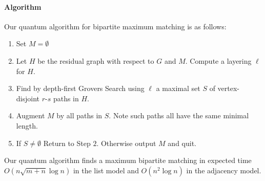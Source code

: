 \paragraph{Algorithm}
Our quantum algorithm for bipartite maximum matching is as follows:
\begin{enumerate}
\item Set $M = \emptyset$
\item  Let $H$ be the residual graph with respect to $G$ and $M$. Compute a layering $\ell$ for $H$.
\item Find by depth-first Grovers Search using $\ell$ a maximal set $S$ of vertex-disjoint $r$-$s$ paths in $H$.
\item Augment $M$ by all paths in $S$. Note such paths all have the same minimal length.
\item If $S\neq \emptyset$ Return to Step $2$. Otherwise output $M$ and quit.
\end{enumerate} 
\begin{theorem}
Our quantum algorithm finds a maximum bipartite matching in expected time $O(n\sqrt{m+n}\log n)$ in the list model and $O(n^2\log n)$ in the adjacency model.
\end{theorem}
